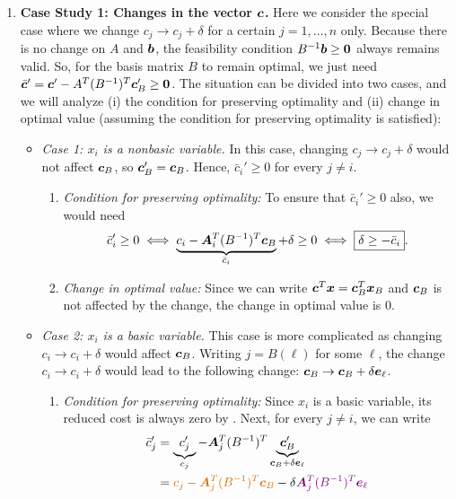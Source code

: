 \begin{enumerate}
\item \textbf{Case Study 1: Changes in the vector \(\bm{c}\).} Here we
consider the special case where we change \(c_j\to c_j+\delta\) for a certain
\(j=1,\dotsc,n\) only. Because there is no change on \(A\) and \(\bm{b}\),
the feasibility condition \(B^{-1}\bm{b}\ge\bm{0}\) always remains valid.
So, for the basis matrix \(B\) to remain optimal, we just need
\(\bar{\bm{c}}'=\bm{c}'-A^{T}(B^{-1})^{T}\bm{c}_{B}'\ge\bm{0}\). The situation
can be divided into two cases, and we will analyze (i) the condition for
preserving optimality and (ii) change in optimal value (assuming the condition
for preserving optimality is satisfied):
\begin{itemize}
\item \emph{Case 1: \(x_i\) is a nonbasic variable.} In this case, changing
\(c_j\to c_j+\delta\) would not affect \(\bm{c}_{B}\), so
\(\bm{c}_{B}'=\bm{c}_{B}\). Hence, \(\bar{c}_i'\ge 0\) for every \(j\ne i\).
\begin{enumerate}[label={(\arabic*)}]
\item \emph{Condition for preserving optimality:} To ensure that
\(\bar{c}_i'\ge 0\) also, we would need 
\[
\bar{c}_i'\ge 0
\iff \underbrace{c_i-\bm{A}_i^{T}(B^{-1})^{T}\bm{c}_{B}}_{\bar{c}_i}+\delta\ge 0
\iff \boxed{\delta\ge -\bar{c}_i}.
\]
\item \emph{Change in optimal value:} Since we can write
\(\bm{c}^{T}\bm{x}=\bm{c}_{B}^{T}\bm{x}_{B}\) and \(\bm{c}_{B}\) is
not affected by the change, the change in optimal value is \(\boxed{0}\).
\end{enumerate}
\item \emph{Case 2: \(x_i\) is a basic variable.} This case is more complicated
as changing \(c_i\to c_i+\delta\) would affect \(\bm{c}_{B}\). Writing
\(j=B(\ell)\) for some \(\ell\), the change \(c_i\to c_i+\delta\) would lead to
the following change: \(\bm{c}_{B}\to\bm{c}_{B}+\delta\bm{e}_{\ell}\).
\begin{enumerate}[label={(\arabic*)}]
\item \emph{Condition for preserving optimality:} Since \(x_i\) is a basic
variable, its reduced cost is always zero by .
Next, for every \(j\ne i\), we can write
\begin{align*}
\bar{c}_j'&=\underbrace{c_j'}_{c_j}-\vect{A}_j^{T}(B^{-1})^{T}
\underbrace{\vect{c}_{B}'}_{\vect{c}_{B}+\delta\vect{e}_{\ell}} \\
&=\orc{c_j-\vect{A}_j^{T}(B^{-1})^{T}\vect{c}_{B}}-\delta\vc{\vect{A}_j^{T}(B^{-1})^{T}\vect{e}_{\ell}} \\

\end{align*}
\end{enumerate}
\end{itemize}
\end{enumerate}
